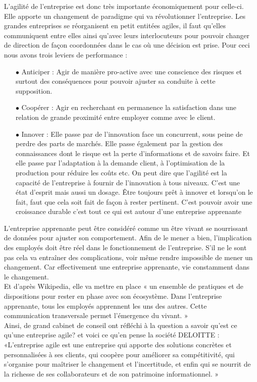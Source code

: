 \documentclass[12pt,a4paper]{article}
\begin{document}
L’agilité de l’entreprise est donc très importante économiquement pour celle-ci. Elle apporte un changement de paradigme qui va révolutionner l’entreprise. Les grandes entreprises se réorganisent en petit entitées agiles, il faut qu’elles communiquent entre elles ainsi qu’avec leurs interlocuteurs pour pouvoir changer de direction  de façon coordonnées dans le cas où une décision est prise. 
Pour ceci nous avons trois leviers de performance : 
\begin{itemize}
\item[$\bullet$] Anticiper : Agir de manière pro-active avec une conscience des risques et surtout des conséquences pour pouvoir ajuster sa conduite à cette supposition.
\item[$\bullet$] Coopérer : Agir en recherchant en permanence la satisfaction dans une relation de grande proximité entre employer comme avec le client.
\item[$\bullet$] Innover : Elle passe par de l’innovation face un concurrent, sous peine de perdre des parts de marchés. Elle passe également par la gestion des connaissances dont le risque est la perte d’informations et de savoirs faire. Et elle passe par l’adaptation à la demande client,  à l’optimisation de la production pour réduire les coûts etc. On peut dire que l’agilité est la capacité de l’entreprise à fournir de l’innovation à tous niveaux. C’est une état d’esprit mais aussi un dosage. Être toujours prêt à innover et lorsqu’on le fait, faut que cela soit fait de façon à rester pertinent. C'est pouvoir avoir une croissance durable c'est tout ce qui est autour d'une entreprise apprenante\\
\end{itemize}
L'entreprise apprenante peut être considéré comme un être vivant se nourrissant de données pour ajuster son comportement. Afin de le mener a bien, l'implication des employés doit être réel dans le fonctionnement de l'entreprise. S'il ne le sont pas cela va entraîner des complications, voir même rendre impossible de mener un changement. Car effectivement une entreprise apprenante, vie constamment dans le changement.\\
Et d'après Wikipedia, elle va mettre en place « un ensemble de pratiques et de dispositions pour rester en phase avec son écosystème. Dans l'entreprise apprenante, tous les employés apprennent les uns des autres. Cette communication transversale permet l'émergence du vivant. »\\

Ainsi, de grand cabinet de conseil ont réfléchi à la question a savoir qu'est ce qu'une entreprise agile? et voici ce qu'en pense la société DELOITTE :  «L’entreprise agile est une entreprise qui apporte des solutions concrètes et personnalisées à ses clients, qui coopère pour améliorer sa compétitivité, qui s’organise pour maîtriser le changement et l’incertitude, et enfin qui se nourrit de la richesse de ses collaborateurs et de son patrimoine informationnel. »
\end{document}
